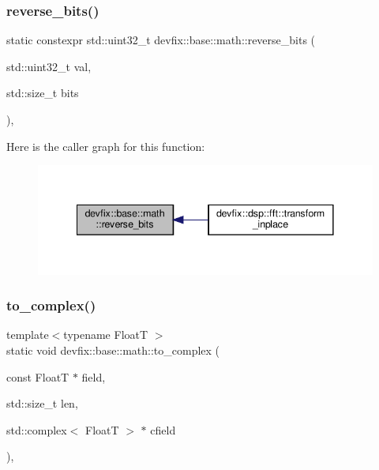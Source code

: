 \subsubsection{\texorpdfstring{reverse\+\_\+bits()}{reverse\_bits()}}
{\footnotesize\ttfamily static constexpr std\+::uint32\+\_\+t devfix\+::base\+::math\+::reverse\+\_\+bits (\begin{DoxyParamCaption}\item[{std\+::uint32\+\_\+t}]{val,  }\item[{std\+::size\+\_\+t}]{bits }\end{DoxyParamCaption})\hspace{0.3cm}{\ttfamily [inline]}, {\ttfamily [static]}}

Here is the caller graph for this function\+:
\nopagebreak
\begin{figure}[H]
\begin{center}
\leavevmode
\includegraphics[width=341pt]{structdevfix_1_1base_1_1math_af3260ac1a62b3e9f6feb0f212aa8f796_icgraph}
\end{center}
\end{figure}
\mbox{\label{structdevfix_1_1base_1_1math_a212f0b2e675de08688438e5bafb450c7}} 
\subsubsection{\texorpdfstring{to\+\_\+complex()}{to\_complex()}\hspace{0.1cm}{\footnotesize\ttfamily [1/3]}}
{\footnotesize\ttfamily template$<$typename FloatT $>$ \\
static void devfix\+::base\+::math\+::to\+\_\+complex (\begin{DoxyParamCaption}\item[{const FloatT $\ast$}]{field,  }\item[{std\+::size\+\_\+t}]{len,  }\item[{std\+::complex$<$ FloatT $>$ $\ast$}]{cfield }\end{DoxyParamCaption})\hspace{0.3cm}{\ttfamily [inline]}, {\ttfamily [static]}}


